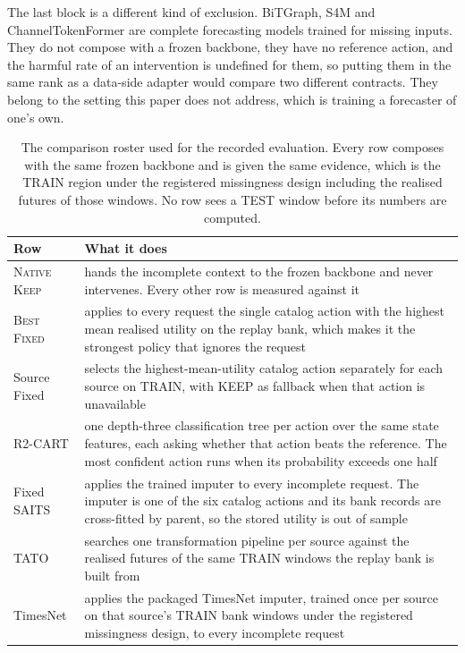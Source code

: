 \documentclass{article}
\begin{document}
The last block is a different kind of exclusion. BiTGraph, S4M and ChannelTokenFormer are
complete forecasting models trained for missing inputs. They do not compose with a frozen
backbone, they have no reference action, and the harmful rate of an intervention is undefined
for them, so putting them in the same rank as a data-side adapter would compare two different
contracts. They belong to the setting this paper does not address, which is training a
forecaster of one's own.

\begin{table}[!t]
  \caption{The comparison roster used for the recorded evaluation. Every row composes with
  the same frozen backbone and is given the same evidence, which is the TRAIN region under the
  registered missingness design including the realised futures of those windows. No row sees
  a TEST window before its numbers are computed.}
  \label{tab:app-roster}
  \centering
  \small
  \setlength{\tabcolsep}{4pt}
\begin{tabular}{@{}l p{}@{}}
    \toprule
    Row & What it does \\
    \midrule
    \textsc{Native Keep} & hands the incomplete context to the frozen backbone and never intervenes. Every other row is measured against it \\
    \textsc{Best Fixed} & applies to every request the single catalog action with the highest mean realised utility on the replay bank, which makes it the strongest policy that ignores the request \\
    Source Fixed & selects the highest-mean-utility catalog action separately for each source on TRAIN, with KEEP as fallback when that action is unavailable \\
    R2-CART & one depth-three classification tree per action over the same state features, each asking whether that action beats the reference. The most confident action runs when its probability exceeds one half \\
    Fixed SAITS & applies the trained imputer to every incomplete request. The imputer is one of the six catalog actions and its bank records are cross-fitted by parent, so the stored utility is out of sample \\
    TATO & searches one transformation pipeline per source against the realised futures of the same TRAIN windows the replay bank is built from \\
    TimesNet & applies the packaged TimesNet imputer, trained once per source on that source's TRAIN bank windows under the registered missingness design, to every incomplete request \\

\end{tabular}
\end{table}
\end{document}
